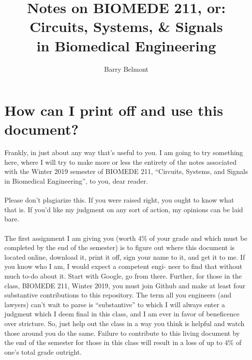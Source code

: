 \documentclass[11pt]{book}
\title{Notes on BIOMEDE 211, or: \\ Circuits, Systems, \& Signals \\ in Biomedical Engineering}
\author{Barry Belmont}
\begin{document}
\frontmatter
\maketitle
\dominitoc
\tableofcontents


\newpage 
\section{How can I print off and use this document?}
Frankly, in just about any way that’s useful to you. I am going to try something here, where I will try to make more or less the entirety of the notes associated with the Winter 2019 semester of BIOMEDE 211, ``Circuits, Systems, and Signals in Biomedical Engineering'', to you, dear reader.\\
\\
Please don’t plagiarize this. If you were raised right, you ought to know what that is. If you’d like my judgment on any sort of action, my opinions can be laid bare.\\
\\
The first assignment I am giving you (worth 4\% of your grade and which must be completed by the end of the semester) is to figure out where this document is located online, download it, print it off, sign your name to it, and get it to me. If you know who I am, I would expect a competent engi- neer to find that without much to-do about it. Start with Google, go from there. Further, for those in the class, BIOMEDE 211, Winter 2019, you must join Github and make at least four substantive contributions to this repository. The term all you engineers (and lawyers) can’t wait to parse is “substantive” to which I will always enter a judgment which I deem final in this class, and I am ever in favor of beneficence over stricture. So, just help out the class in a way you think is helpful and watch those around you do the same. Failure to contribute to this living document by the end of the semester for those in this class will result in a loss of up to 4\% of one's total grade outright.

\newpage
\end{document}

